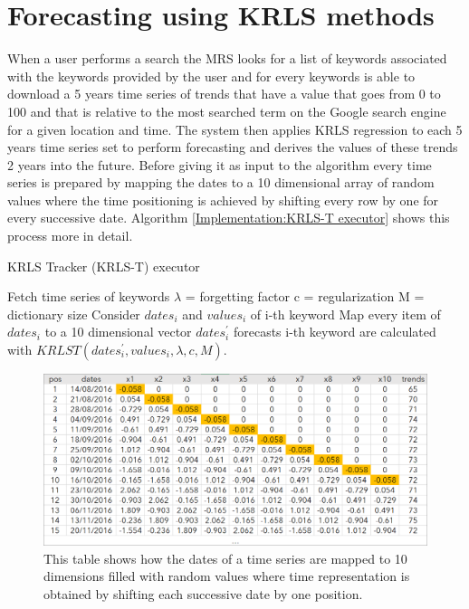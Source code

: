 \newpage
\section{Forecasting using KRLS methods}


When a user performs a search the \ac{MRS} looks for a list of keywords associated with the keywords provided by the user and for every keywords is able to download a 5 years time series of trends that have a value that goes from 0 to 100 and that is relative to the most searched term on the Google search engine for a given location and time. The system then applies \ac{KRLS} regression to each 5 years time series set to perform forecasting and derives the values of these trends 2 years into the future. Before giving it as input to the algorithm every time series is prepared by mapping the dates to a 10 dimensional array of random values where the time positioning is achieved by shifting every row by one for every successive date. Algorithm \ref{Implementation:KRLS-T executor} shows this process more in detail.

\begin{algorithm}
	\caption{KRLS Tracker (KRLS-T) executor}
	\label{Implementation:KRLS-T executor}
	\begin{algorithmic}
		\STATE Fetch time series of keywords
		\STATE \(\lambda\) = forgetting factor
		\STATE c = regularization
		\STATE M = dictionary size
		\STATE Consider \(dates_{i}\) and \(values_{i}\) of i-th keyword 
		\STATE Map every item of \(dates_i\) to a 10 dimensional vector \(dates_{i}^{'}\)
		\STATE forecasts i-th keyword are calculated with \(KRLST(dates_{i}^{'}, values_i, \lambda, c, M)\).
		\ENDFOR
	\end{algorithmic}
\end{algorithm}

\begin{figure}[h!]
	\centering
	\includegraphics[scale=0.68]{img/datapreparation.png}
	\caption{This table shows how the dates of a time series are mapped to 10 dimensions filled with random values where time representation is obtained by shifting each successive date by one position.}
	\label{Implementation:Data Preparation}
\end{figure}

